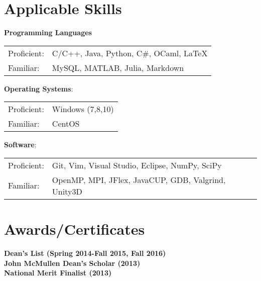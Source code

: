 \documentclass[article,8pt]{article}
\begin{document}
\section{Applicable Skills}
\textbf{Programming Languages}\\
\begin{tabular}{lp{15cm}}
Proficient:&C/C++, Java, Python, C\#, OCaml, LaTeX\\
Familiar:&MySQL, MATLAB, Julia, Markdown\\
\end{tabular}
\textbf{Operating Systems}:\\
\begin{tabular}{lp{15cm}}
Proficient:& Windows (7,8,10)\\
Familiar:&CentOS\\
\end{tabular}
\textbf{Software}:\\
\begin{tabular}{lp{15cm}}
Proficient:&Git, Vim, Visual Studio, Eclipse, NumPy, SciPy\\
Familiar:&OpenMP, MPI, JFlex, JavaCUP, GDB, Valgrind, Unity3D\\
\end{tabular}
\newpage
\section{Awards/Certificates}
\textbf{Dean's List (Spring 2014-Fall 2015, Fall 2016)}\\
\textbf{John McMullen Dean's Scholar (2013)}\\
\textbf{National Merit Finalist (2013)}\\

\end{document}
